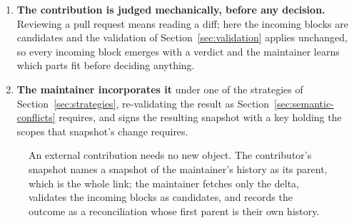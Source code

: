 \documentclass[11pt,a4paper]{article}
\begin{document}
\begin{enumerate}[leftmargin=1.6em]
from \texttt{pull}.
  \item \textbf{The contribution is judged mechanically, before any decision.}
Reviewing a pull request means reading a diff; here the incoming blocks are
candidates and the validation of Section~\ref{sec:validation} applies
unchanged, so every incoming block emerges with a verdict and the maintainer
learns which parts fit before deciding anything.
  \item \textbf{The maintainer incorporates it} under one of the strategies of
  Section~\ref{sec:strategies}, re-validating the result as
  Section~\ref{sec:semantic-conflicts} requires, and signs the resulting
  snapshot with a key holding the scopes that snapshot's change requires.
\end{enumerate}

\begin{figure}[t]
\centering
{}
\caption{An external contribution needs no new object. The contributor's
snapshot names a snapshot of the maintainer's history as its parent, which is the
whole link; the maintainer fetches only the delta, validates the incoming blocks
as candidates, and records the outcome as a reconciliation whose first parent is
their own history.}
\label{fig:contribution}
\end{figure}
\end{document}
